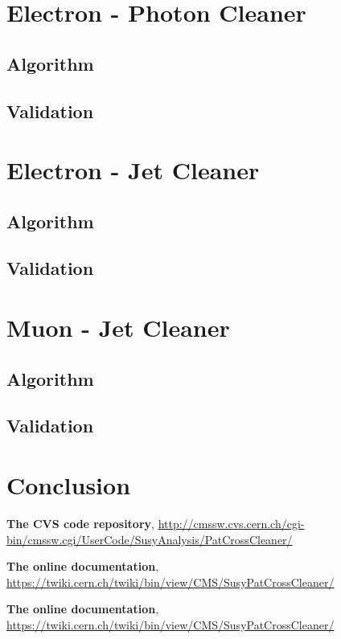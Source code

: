 \documentclass{cmspaper}
\begin{document}
\section{Electron - Photon Cleaner}
\subsection{Algorithm}
\subsection{Validation}

\section{Electron - Jet Cleaner}%
\subsection{Algorithm}
\subsection{Validation}

\section{Muon - Jet Cleaner}
\subsection{Algorithm}
\subsection{Validation}

\section{Conclusion}


\pagebreak
\begin{thebibliography}{9}
   {\bf The CVS code repository},
    \underline{http://cmssw.cvs.cern.ch/cgi-bin/cmssw.cgi/UserCode/SusyAnalysis/PatCrossCleaner/}

   {\bf The online documentation},
    \underline{https://twiki.cern.ch/twiki/bin/view/CMS/SusyPatCrossCleaner/}

   {\bf The online documentation},
    \underline{https://twiki.cern.ch/twiki/bin/view/CMS/SusyPatCrossCleaner/}

\end{thebibliography}
 
\end{document}
